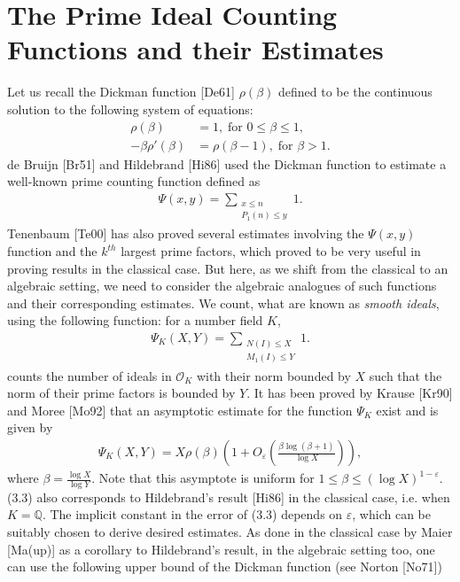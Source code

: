 \documentclass[12pt]{article}
\numberwithin{equation}{section}
\numberwithin{equation}{section}
\begin{document}
\section{The Prime Ideal Counting Functions and their Estimates}
Let us recall the Dickman function [De61] $\rho(\beta)$ defined to be the continuous solution to the following system of equations:
\begin{align}
    \rho(\beta) &= 1,\;\text{for $0 \leq \beta \leq 1$}, \nonumber \\
    -\beta\rho'(\beta) &= \rho(\beta -1),\;\text{for $\beta>1$} .\nonumber
\end{align}
de Bruijn [Br51] and Hildebrand [Hi86] used the Dickman function to estimate a well-known prime counting function defined as
\begin{align}
    \Psi(x,y) = \sum_{\substack{x \leq n \\ P_1(n)\leq y}}1.
\end{align}
Tenenbaum [Te00] has also proved several estimates involving the $\Psi(x,y)$ function and the $k^{th}$ largest prime factors, which proved to be very useful in proving results in the classical case. But here, as we shift from the classical to an algebraic setting, we need to consider the algebraic analogues of such functions and their corresponding estimates. We count, what are known as \textit{smooth ideals}, using the following function: for a number field $K$, 
\begin{align}
    \Psi_K(X,Y) = \sum_{\substack{N(I) \leq X \\ M_1(I) \leq Y}} 1.
\end{align}
counts the number of ideals in $\mathcal{O}_K$ with their norm bounded by $X$ such that the norm of their prime factors is bounded by $Y$. It has been proved by Krause [Kr90] and Moree [Mo92] that an asymptotic estimate for the function $\Psi_K$ exist and is given by
\begin{align}
    \Psi_K(X,Y) =X\rho(\beta) \left(1+O_{\varepsilon}\left(\frac{\beta\log(\beta+1)}{\log X}\right)\right),
\end{align}
where $\beta = \frac{\log X}{\log Y}$. Note that this asymptote is uniform for $1 \leq \beta \leq (\log X)^{1-\varepsilon}$. (3.3) also corresponds to Hildebrand's result [Hi86] in the classical case, i.e. when $K=\mathbb{Q}$. The implicit constant in the error of (3.3) depends on $\varepsilon$, which can be suitably chosen to derive desired estimates. As done in the classical case by Maier [Ma(up)] as a corollary to Hildebrand's result, in the algebraic setting too, one can use the following upper bound of the Dickman function (see Norton [No71])
\end{document}
